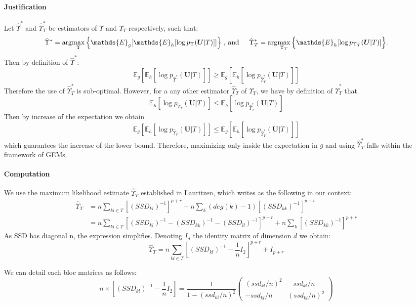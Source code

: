 \documentclass[11pt,a4paper]{article}
\newcommand{\argmax}{\arg\!\max}
\newcommand{\Ubf}{\boldsymbol{U}}
\newcommand{\Esp}{\mathds{E}}
\begin{document}
\paragraph{Justification\\}
Let $\hat{\Upsilon}^*$ and $\hat{\Upsilon}_T^*$ be estimators of $\Upsilon$ and $\Upsilon_T$ respectively, such that:
$$\hat{\Upsilon}^*=\argmax_\Upsilon \Big\{\Esp_g[\Esp_h[\log p_\Upsilon(\Ubf|T)]]\Big\} \text{ , and\hspace{0.5cm}}\hat{\Upsilon}_T^*=\argmax_{\Upsilon_T} \Big\{\Esp_h[\log p_{\Upsilon_T}(\Ubf|T)]\Big\}.$$
Then by definition of $\hat{\Upsilon}^*$:
$$\Esp_g[\Esp_h[\log p_{\hat{\Upsilon}^*}(\Ubf|T)]] \geq \Esp_g[\Esp_h[\log p_{\hat{\Upsilon}_T^*}(\Ubf|T)]] $$
Therefore the use of $\hat{\Upsilon}_T^*$ is sub-optimal. However, for a any other estimator  $\hat{\Upsilon}_T$ of $\Upsilon_T$, we have by definition of $\hat{\Upsilon}_T^*$ that
$$\Esp_h[\log p_{\hat{\Upsilon}_T}(\Ubf|T)] \leq \Esp_h[\log p_{\hat{\Upsilon}_T^*}(\Ubf|T)] $$
Then by increase of the expectation we obtain
$$\Esp_g[\Esp_h[\log p_{\hat{\Upsilon}_T}(\Ubf|T)]] \leq \Esp_g[\Esp_h[\log p_{\hat{\Upsilon}_T^*}(\Ubf|T)]] $$
which guarantees the increase of the lower bound. Therefore, maximizing only inside the expectation in $g$ and using $\hat{\Upsilon}_T^*$ falls within the framework of GEMs.

\paragraph{Computation\\}
 We use the maximum likelihood estimate $\hat{\Upsilon}_T$ established in Lauritzen, which writes as the following in our context:
\begin{align*}
\widehat{\Upsilon}_T &= n  \sum_{kl\in T}   [(SSD_{kl})^{-1}]^{p+r} - n\sum_k (deg(k)-1)[(SSD_{kk})^{-1}]^{p+r}\\
&=n \sum_{kl\in T}  [(SSD_{kl})^{-1} - (SSD_{kk})^{-1} -  (SSD_{ll})^{-1} ]^{p+r} + n\sum_k[(SSD_{kk})^{-1}]^{p+r}
\end{align*}
As SSD has diagonal n, the expression simplifies. Denoting $I_d$ the identity matrix of dimension $d$ we obtain:
$$\widehat{\Upsilon}_T =n\sum_{kl\in T} [(SSD_{kl})^{-1} -\frac{1}{n} I_2]^{p+r}+ I_{p+r}$$

We can detail each bloc matrices as follows:
\[
n\times [(SSD_{kl})^{-1} - \frac{1}{n}I_2] = \frac{1}{1-(ssd_{kl}/n)^2}
\left(\begin{array}{cc}
		(ssd_{kl}/n)^2   & -ssd_{kl}/n\\
		-ssd_{kl}/n& (ssd_{kl}/n)^2 
		\end{array}\right)
\]
\end{document}
